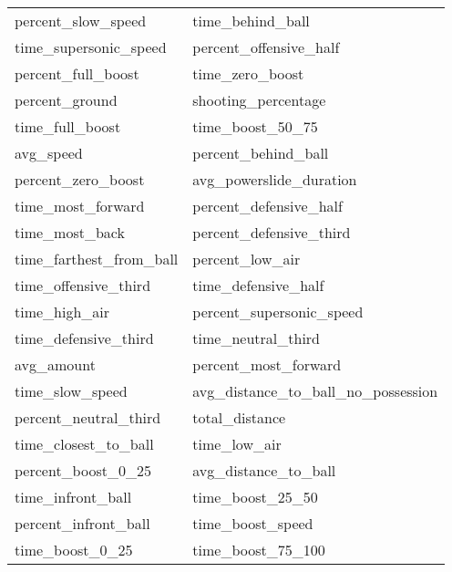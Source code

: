 \begin{longtable}{p{} p{}}
percent\_slow\_speed                    & time\_behind\_ball                      \\
time\_supersonic\_speed                 & percent\_offensive\_half                \\
percent\_full\_boost                    & time\_zero\_boost                       \\
percent\_ground                         & shooting\_percentage                    \\
time\_full\_boost                       & time\_boost\_50\_75                     \\
avg\_speed                              & percent\_behind\_ball                   \\
percent\_zero\_boost                    & avg\_powerslide\_duration               \\
time\_most\_forward                     & percent\_defensive\_half                \\
time\_most\_back                        & percent\_defensive\_third               \\
time\_farthest\_from\_ball              & percent\_low\_air                       \\
time\_offensive\_third                  & time\_defensive\_half                   \\
time\_high\_air                         & percent\_supersonic\_speed              \\
time\_defensive\_third                  & time\_neutral\_third                    \\
avg\_amount                             & percent\_most\_forward                  \\
time\_slow\_speed                       & avg\_distance\_to\_ball\_no\_possession \\
percent\_neutral\_third                 & total\_distance                         \\
time\_closest\_to\_ball                 & time\_low\_air                          \\
percent\_boost\_0\_25                   & avg\_distance\_to\_ball                 \\
time\_infront\_ball                     & time\_boost\_25\_50                     \\
percent\_infront\_ball                  & time\_boost\_speed                      \\
time\_boost\_0\_25                      & time\_boost\_75\_100                    \\

\end{longtable}
